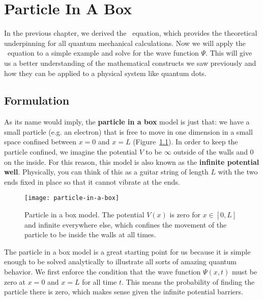 %

%

\chapter{Particle In A Box} \label{ch:box}
In the previous chapter, we derived the \Sch\ equation, which provides the theoretical underpinning for all quantum mechanical calculations. Now we will apply the \Sch\ equation to a simple example and solve for the wave function $\Psi$. This will give us a better understanding of the mathematical constructs we saw previously and how they can be applied to a physical system like quantum dots.

\section{Formulation}
As its name would imply, the \textbf{particle in a box} model is just that: we have a small particle (e.g. an electron) that is free to move in one dimension in a small space confined between $x=0$ and $x=L$ (Figure~\ref{fig:box}). In order to keep the particle confined, we imagine the potential $V$ to be $\infty$ outside of the walls and 0 on the inside. For this reason, this model is also known as the \textbf{infinite potential well}. Physically, you can think of this as a guitar string of length $L$ with the two ends fixed in place so that it cannot vibrate at the ends.

\begin{figure}[!h]
	\centering
	\texttt{[image: particle-in-a-box]}
	\caption{Particle in a box model. The potential $V(x)$ is zero for $x\in[0,L]$ and infinite everywhere else, which confines the movement of the particle to be inside the walls at all times.}
	\label{fig:box}
\end{figure}

The particle in a box model is a great starting point for us because it is simple enough to be solved analytically to illustrate all sorts of amazing quantum behavior. We first enforce the condition that the wave function $\Psi(x,t)$ must be zero at $x=0$ and $x=L$ for all time $t$. This means the probability of finding the particle there is zero, which makes sense given the infinite potential barriers. \par 

